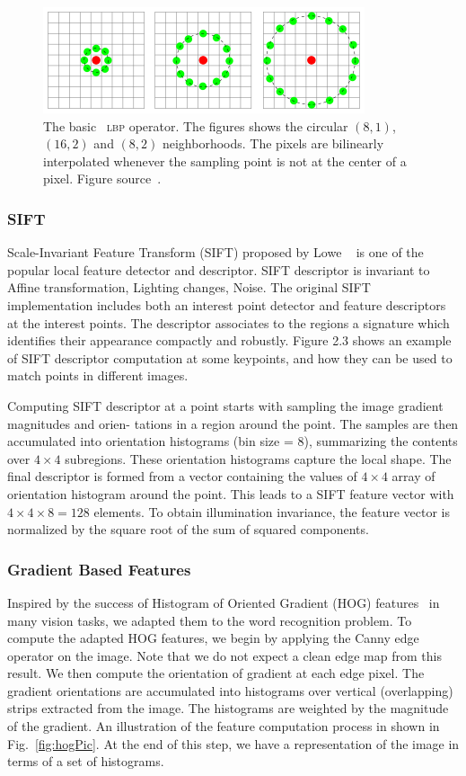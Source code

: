 \begin{figure}
\centering
\includegraphics[scale=1]{figures/Lbp_neighbors.png}
\caption{The basic ~\textsc{lbp} operator. The figures shows the circular $(8, 1)$, $(16,2)$ and $(8,2)$ neighborhoods. The pixels are bilinearly interpolated whenever the sampling point is not at the center of a pixel. Figure source~\cite{LBPOjala2002}.}
\label{fig:lbpPic}
\end{figure}

\subsubsection{\textsc{SIFT}}
Scale-Invariant Feature Transform (\textsc{SIFT}) proposed by Lowe ~\cite{Lowe04} is one of the popular local feature detector and descriptor. SIFT descriptor is invariant to Affine transformation, Lighting changes, Noise. The original SIFT implementation includes both an interest point detector and feature descriptors at
the interest points. The descriptor associates to the regions a signature which identifies their appearance compactly and robustly. Figure 2.3 shows an example of SIFT descriptor computation at some
keypoints, and how they can be used to match points in different images. 

Computing \textsc{SIFT} descriptor at a point starts with sampling the image gradient magnitudes and orien-
tations in a region around the point. The samples are then accumulated into orientation histograms (bin
size = 8), summarizing the contents over $4 \times 4$ subregions. These orientation histograms capture the
local shape. The final descriptor is formed from a vector containing the values of $4 \times 4$ array of orientation histogram around the point. This leads to a \textsc{SIFT} feature vector with $4 \times 4 \times 8 = 128$ elements. To obtain illumination invariance, the feature vector is normalized by the square root of the sum of squared components.

\subsubsection{Gradient Based Features~\cite{Vibhor13}}
Inspired by the success of Histogram of Oriented Gradient (HOG) features~\cite{Dalal05} in many vision tasks, we adapted them to the word recognition problem. To compute the adapted HOG features, we begin by applying the Canny edge operator on the image. Note that we do not expect a clean edge map from this result. We then compute the orientation of gradient at each edge pixel. The gradient orientations are accumulated into histograms over vertical (overlapping) strips extracted from the image. The histograms are weighted by the magnitude of the gradient. An illustration of the feature computation process in shown in Fig.~\ref{fig:hogPic}. At the end of this step, we have a representation of the image in terms of a set of histograms.

